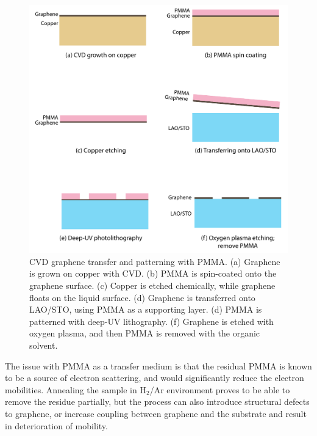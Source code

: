 \documentclass[pdflatex, sectionletters, 12pt, final, phd]{pittetd}    %
\begin{document}
\begin{figure}[p]
	\centering
	\includegraphics[width=.90\textwidth]{Drawing/PMMATransfer.pdf}
	\caption[CVD graphene transfer and patterning with PMMA]{CVD graphene transfer and patterning with PMMA. (a) Graphene is grown on copper with CVD. (b) PMMA is spin-coated onto the graphene surface. (c) Copper is etched chemically, while graphene floats on the liquid surface. (d) Graphene is transferred onto LAO/STO, using PMMA as a supporting layer. (d) PMMA is patterned with deep-UV lithography. (f) Graphene is etched with oxygen plasma, and then PMMA is removed with the organic solvent.}
	\label{FIG:PMMATransfer}
\end{figure}

The issue with PMMA as a transfer medium is that the residual PMMA is known to be a source of electron scattering, and would significantly reduce the electron mobilities\cite{pirkle2011effect, lin2011graphene, cheng2011toward}. Annealing the sample in H$_2$/Ar environment proves to be able to remove the residue partially, but the process can also introduce structural defects to graphene\cite{lin2011graphene}, or increase coupling between graphene and the substrate and result in deterioration of mobility\cite{cheng2011toward}. 
\end{document}
